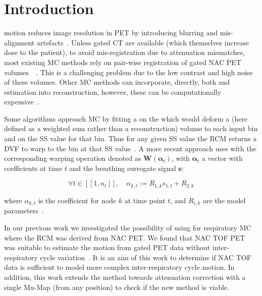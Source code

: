 \section{Introduction} \label{sec:introduction}
     motion reduces image resolution in \gls{PET} by introducing blurring and mis-alignment artefacts~\cite{Nehmeh2008a}. Unless gated \gls{CT} are available (which themselves increase dose to the patient), to avoid mis-registration due to attenuation mismatches, most existing \gls{MC} methods rely on pair-wise registration of gated \gls{NAC} \gls{PET} volumes~\cite{LungMotionDiaphragmBaiBib}~\cite{Oliveira2014}. This is a challenging problem due to the low contrast and high noise of these volumes. Other \gls{MC} methods can incorporate, directly, both  and  estimation into reconstruction, however, these can be computationally expensive~\cite{Bousse2016b}.
    
    Some  algorithms approach \gls{MC} by fitting a  on the  which would deform a  (here defined as a weighted sum rather than a  reconstruction) volume to each input bin and on the \gls{SS} value for that bin. Thus for any given \gls{SS} value the \gls{RCM} returns a \gls{DVF} to warp to the bin at that \gls{SS} value~\cite{McClelland2013}. A more recent approach uses  with the corresponding warping operation denoted as $\mathbf{W}(\mathbf{\alpha}_t)$, with $\mathbf{\alpha}_t$ a vector with coefficients at time $t$ and the breathing surrogate signal $\mathbf{s}$:
    
    \begin{equation}
        \forall t \in [[1,n_t]],\quad \alpha_{k,t} := R_{1,k} s_{1,t} + R_{2,k}
    \end{equation}
    
    \noindent where $\alpha_{k,t}$ is the coefficient for node $k$ at time point $t$, and $R_{i,k}$ are the model parameters~\cite{McClelland2017}.
    
    In our previous work we investigated the possibility of using  for respiratory \gls{MC} where the \gls{RCM} was derived from \gls{NAC} \gls{PET}. We found that \gls{NAC} \gls{TOF} \gls{PET} was suitable to estimate the motion from gated PET data  without inter-respiratory cycle variation~\cite{Whitehead2019ImpactPET}. It is an aim of this work to determine if \gls{NAC} \gls{TOF} data is sufficient to model more complex inter-respiratory cycle motion. In addition, this work extends the method towards attenuation correction with a single \gls{Mu-Map} (from any position) to check if the new method is viable.

